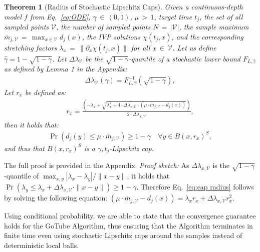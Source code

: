 \documentclass[letterpaper]{article} %
\newtheorem{theorem}{Theorem}
\newcommand{\calV}{\mathcal{V}}
\begin{document}
\begin{theorem}[Radius of Stochastic Lipschitz Caps]\label{thm:lipschitz cap}
    Given a continuous-depth model $f$ from Eq.~\eqref{eq:ODE}, $\gamma\,{\in}\,(0,1)$, $\mu\,{>}\,1$, target time $t_j$,
    the set of all sampled points $\calV$, the number of sampled points $N\,{=}\,|\calV|$, the sample maximum $\bar{m}_{j,\calV}\,{=}\,\max_{x\in\calV} d_j(x)$, the IVP solutions $\chi(t_j,x)$, and the corresponding stretching factors $\lambda_x\,{=}\,\|\partial_x\chi(t_j,x)\|$ for all $x\,{\in}\,\calV$. Let us define $\hat{\gamma} = 1-\sqrt{1-\gamma}$.
    Let $\Delta\lambda_{\calV}$ be the $\sqrt{1-\gamma}$-quantile of a stochastic lower bound $F_{L,\hat{\gamma}}$ as defined by Lemma 1 in the Appendix:
    \begin{align}\label{eq:expected difference quotient}
        \Delta\lambda_{\calV}(\gamma) = F_{L,\hat{\gamma}}^{-1}(\sqrt{1-\gamma}),
    \end{align}
    Let $r_x$ be defined as:
    \begin{align}\label{eq:cap radius}
        r_{x} = \frac{\left(-\lambda_x + \sqrt{\lambda_x^2 + 4\cdot\Delta\lambda_{x,\calV}\cdot(\mu\cdot\bar{m}_{j,\calV}-d_j(x))}\right)}{2\cdot\Delta\lambda_{x,\calV}},
    \end{align}
    then it holds that:
    \begin{align}\label{eq:cap probability}
        \Pr\left(d_j(y) \le \mu\cdot \bar{m}_{j,\calV}\right)\ge 1-\gamma\quad \forall y\in B(x,r_x)^S,
    \end{align}
    and thus that $B(x, r_x)^S$ is a $\gamma, t_j$-Lipschitz cap.
\end{theorem}
%
The full proof is provided in the Appendix. \emph{Proof sketch:} As $\Delta\lambda_{x,\calV}$ is the $\sqrt{1-\gamma}$-quantile of $\max_{x,y}|\lambda_x-\lambda_y|/\|x-y\|$, it holds that $\Pr(\lambda_y \le \lambda_x + \Delta\lambda_{x,\calV} \cdot \|x-y\|)\ge 1-\gamma$. Therefore Eq.~\eqref{eq:cap radius} follows by solving the following equation: $(\mu\cdot\bar{m}_{j,\calV}-d_j(x))=\lambda_x r_x + \Delta\lambda_{x,\calV} r_x^2$.

Using conditional probability, we are able to state that the convergence guarantee holds for the GoTube Algorithm, thus ensuring that the Algorithm terminates in finite time even using stochastic Lipschitz caps around the samples instead of deterministic local balls.
\end{document}
